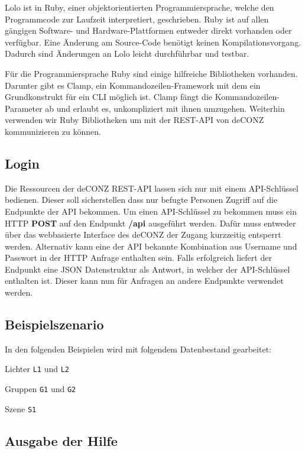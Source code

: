 \documentclass[a4paper,12pt]{article}
\begin{document}
Lolo ist in Ruby, einer objektorientierten Programmiersprache, welche den
Programmcode zur Laufzeit interpretiert, geschrieben. Ruby ist auf allen
gängigen Software- und Hardware-Plattformen entweder direkt vorhanden oder
verfügbar. Eine Änderung am Source-Code benötigt keinen Kompilationsvorgang.
Dadurch sind Änderungen an Lolo leicht durchführbar und testbar.

Für die Programmiersprache Ruby sind einige hilfreiche Bibliotheken vorhanden.
Darunter gibt es Clamp, ein Kommandozeilen-Framework mit dem ein Grundkonstrukt
für ein CLI möglich ist. Clamp fängt die Kommandozeilen-Parameter ab und
erlaubt es, unkompliziert mit ihnen umzugehen. Weiterhin verwenden wir Ruby
Bibliotheken um mit der REST-API von deCONZ kommunizieren zu können.

\subsection{Login}

Die Ressourcen der deCONZ REST-API lassen sich nur mit einem API-Schlüssel
bedienen. Dieser soll sicherstellen dass nur befugte Personen Zugriff auf die
Endpunkte der API bekommen. Um einen API-Schlüssel zu bekommen muss ein HTTP
\textbf{POST} auf den Endpunkt \textbf{/api} ausgeführt werden. Dafür muss
entweder über das webbasierte Interface des deCONZ der Zugang kurzzeitig
entsperrt werden. Alternativ kann eine der API bekannte Kombination aus
Username und Passwort in der HTTP Anfrage enthalten sein. Falls erfolgreich
liefert der Endpunkt eine JSON Datenstruktur als Antwort, in welcher der
API-Schlüssel enthalten ist. Dieser kann nun für Anfragen an andere Endpunkte
verwendet werden.

\subsection{Beispielszenario}

In den folgenden Beispielen wird mit folgendem Datenbestand gearbeitet:

\noindent
Lichter \texttt{L1} und \texttt{L2}

\noindent
Gruppen \texttt{G1} und \texttt{G2}

\noindent
Szene \texttt{S1}

\subsection{Ausgabe der Hilfe}
\end{document}
